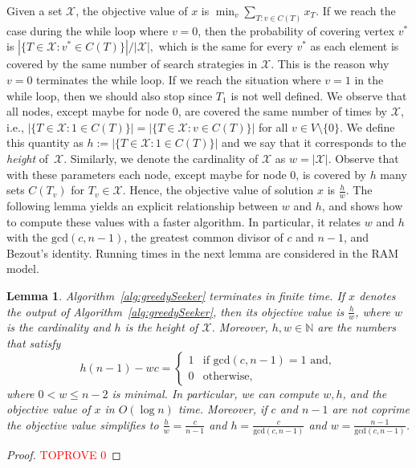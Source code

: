 \documentclass[11pt]{article}
\newtheorem{lemma}{Lemma}[section]
\newcommand{\X}{\mathcal{X}}
\newcommand\+{\mkern2mu}
\newcommand{\T}{T}
\begin{document}
Given a set $\mathcal{X}$, the objective value of $x$ is $\min_v \sum_{T: v\in C(T)} x_T$. If we reach the case during the while loop where $v=0$, then the probability of covering vertex $v^*$ is $
|\{\T\in \mathcal{X}: v^*\in C(\T) \}|/|\mathcal{X}|,
$ 
which is the same for every $v^*$ as each element is covered by the same number of search strategies in $\mathcal{X}$. This is the reason why $v=0$ terminates the while loop. If we reach the situation where $v=1$ in the while loop, then we should also stop since $\T_1$ is not well defined. We observe that all nodes, except maybe for node $0$, are covered the same number of times by $\mathcal{X}$, i.e., $|\{\T\in\mathcal{X}: 1\in C(\T) \}|=|\{\T\in \mathcal{X}: v\in C(\T) \}|$ for all $v\in V\setminus\{0\}$. We define this quantity as $h:= |\{\T\in\mathcal{X}: 1\in C(\T) \}|$ and we say that it corresponds to the \textit{height} of~$\mathcal{X}$. Similarly, we denote the cardinality of $\mathcal{X}$ as $w=|\mathcal{X}|$. Observe that with these parameters each node, except maybe for node $0$, is covered by $h$ many sets $C(T_v)$ for $\T_v\in \X$. Hence, the objective value of solution $x$ is $\frac{h}{w}$. The following lemma yields an explicit relationship between $w$ and $h$, and shows how to compute these values with a faster algorithm. In particular, it relates $w$ and $h$ with the $\text{gcd}(c,n-1)$, the greatest common divisor of $c$ and $n-1$, and Bezout's identity. Running times in the next lemma are considered in the RAM model.

\begin{lemma}\label{lm:bezout}
Algorithm~\ref{alg:greedySeeker} terminates in finite time. If $x$ denotes the output of Algorithm~\ref{alg:greedySeeker}, then its objective value is $\frac{h}{w}$, where $w$ is the cardinality and $h$ is the height of $\mathcal{X}$. Moreover, $h,w\in\mathbb{N}$ are the numbers that satisfy
\begin{equation}
\label{eq:gcd}
h(n-1)-wc= \begin{cases} 1 & \text{if } \text{gcd}(c,n-1)= 1 \text{ and},\\
0 &\text{otherwise,}
\end{cases}
\end{equation}
where $0<w\le n-2$ is minimal.
In particular, we can compute $w,h$, and the objective value of $x$ in $O(\log n)$ time. Moreover, if $c$ and $n-1$ are not coprime the objective value simplifies to $\frac{h}{w}=\frac{c}{n-1}$ and $h=\frac{c}{\text{gcd}(c,n-1)}$ and $w=\frac{n-1}{\text{gcd}(c,n-1)}$.
\end{lemma}
\begin{proof}\textcolor{red}{TOPROVE 0}\end{proof}
\end{document}
